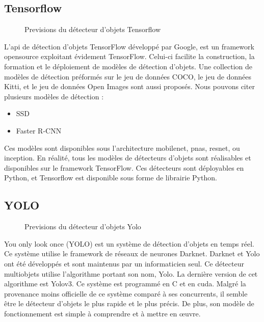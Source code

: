 \documentclass[debug,nodate,hideweeklyreports]{polytech/polytech}
\begin{document}
\subsection{Tensorflow}

\begin{figure}
  \caption{Previsions du détecteur d'objets Tensorflow}
  \label{fig:imgtensor}
\end{figure}
 
L'\gls{api} de détection d'objets TensorFlow développé par Google, est un \gls{framework} \gls{opensource} exploitant évidement TensorFlow. Celui-ci facilite la construction, la formation et le déploiement de modèles de détection d'objets. Une collection de modèles de détection préformés sur le jeu de données COCO, le jeu de données Kitti, et le jeu de données Open Images sont aussi proposés. Nous pouvons citer plusieurs modèles de détection : 
\begin{itemize}
\item SSD 
\item Faster R-CNN
\end{itemize}
Ces modèles sont disponibles sous l’architecture mobilenet, pnas, resnet, ou inception.
En réalité, tous les modèles de détecteurs d’objets sont réalisables et disponibles sur le \gls{framework} TensorFlow. Ces détecteurs sont déployables en Python, et Tensorflow est disponible sous forme de librairie Python.

\subsection{YOLO}

\begin{figure}
  \caption{Previsions du détecteur d'objets Yolo}
  \label{fig:imgyolo}
\end{figure}
 
You only look once (YOLO) est un système de détection d’objets en temps réel. Ce système utilise le \gls{framework} de réseaux de neurones Darknet. Darknet et Yolo ont été développés et sont maintenus par un informaticien seul. Ce détecteur multiobjets utilise l’algorithme portant son nom, Yolo. La dernière version de cet algorithme est Yolov3.
Ce système est programmé en C et en \gls{cuda}.
Malgré la provenance moins officielle de ce système comparé à ses concurrents, il semble être le détecteur d’objets le plus rapide et le plus précis. De plus, son modèle de fonctionnement est simple à comprendre et à mettre en œuvre.
\end{document}
